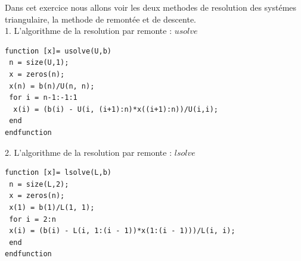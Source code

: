 \documentclass[12pt]{report}
\begin{document}
Dans cet exercice nous allons voir les deux methodes de resolution des systémes triangulaire, la methode de remontée et de descente.\\

1. L'algorithme de la resolution par remonte : $usolve$ 

\begin{lstlisting}
function [x]= usolve(U,b)
 n = size(U,1);
 x = zeros(n);
 x(n) = b(n)/U(n, n);
 for i = n-1:-1:1
  x(i) = (b(i) - U(i, (i+1):n)*x((i+1):n))/U(i,i);
 end
endfunction
\end{lstlisting} 
         
2. L'algorithme de la resolution par remonte : $lsolve$ 

\begin{lstlisting}
function [x]= lsolve(L,b)
 n = size(L,2);
 x = zeros(n);
 x(1) = b(1)/L(1, 1);
 for i = 2:n
 x(i) = (b(i) - L(i, 1:(i - 1))*x(1:(i - 1)))/L(i, i);
 end 
endfunction 
\end{lstlisting}          
         
\end{document}
